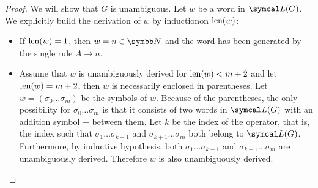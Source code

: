 \begin{proof}
  We will show that \( G \) is unambiguous. Let \( w \) be a word in \( \Cal{L}(G) \). We explicitly build the derivation of \( w \) by induction\IND on \( \operatorname{len}(w) \):
  \begin{itemize}
    \item If \( \operatorname{len}(w) = 1 \), then \( w = n \in \BN \) and the word has been generated by the single rule \( A \to n \).

    \item Assume that \( w \) is unambiguously derived for \( \operatorname{len}(w) < m + 2 \) and let \( \operatorname{len}(w) = m + 2 \), then \( w \) is necessarily enclosed in parentheses. Let \( w = ( \sigma_0 \ldots \sigma_m ) \) be the symbols of \( w \). Because of the parentheses, the only possibility for \( \sigma_0 \ldots \sigma_m \) is that it consists of two words in \( \Cal{L}(G) \) with an addition symbol \( + \) between them. Let \( k \) be the index of the operator, that is, the index such that \( \sigma_1 \ldots \sigma_{k-1} \) and \( \sigma_{k+1} \ldots \sigma_m \) both belong to \( \Cal{L}(G) \). Furthermore, by inductive hypothesis, both \( \sigma_1 \ldots \sigma_{k-1} \) and \( \sigma_{k+1} \ldots \sigma_m \) are unambiguously derived. Therefore \( w \) is also unambiguously derived.
  \end{itemize}
\end{proof}
